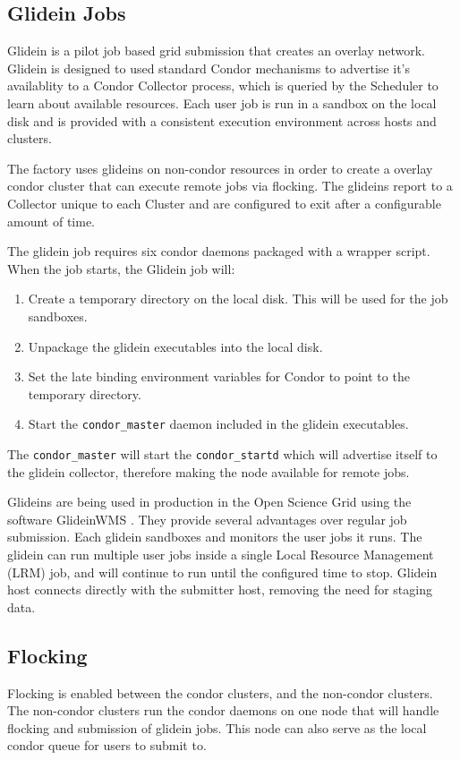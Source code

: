 \documentclass[11pt]{article}
\begin{document}
\subsection{Glidein Jobs}
Glidein  \cite{frey2002condor} is a pilot job based grid submission that creates an overlay network.  Glidein is designed to used standard Condor mechanisms to advertise it's availablity to a Condor Collector process, which is queried by the Scheduler to learn about available resources.  Each user job is run in a sandbox on the local disk and is provided with a consistent execution environment across hosts and clusters.  

The factory uses glideins on non-condor resources in order to create a overlay condor cluster that can execute remote jobs via flocking.  The glideins report to a Collector unique to each Cluster and are configured to exit after a configurable amount of time. 

The glidein job requires six condor daemons packaged with a wrapper script.  When the job starts, the Glidein job will:

\begin{enumerate}
\item Create a temporary directory on the local disk.  This will be used for the job sandboxes.
\item Unpackage the glidein executables into the local disk.
\item Set the late binding environment variables for Condor to point to the temporary directory.
\item Start the  \texttt{condor\_master} daemon included in the glidein executables.
\end{enumerate}

The \texttt{condor\_master} will start the \texttt{condor\_startd} which will advertise itself to the glidein collector, therefore making the node available for remote jobs.  

Glideins are being used in production in the Open Science Grid using the software GlideinWMS \cite{sfiligoi2008glideinwms}.  They provide several advantages over regular job submission.  Each glidein sandboxes and monitors the user jobs it runs.  The glidein can run multiple user jobs inside a single Local Resource Management (LRM) job, and will continue to run until the configured time to stop.  Glidein host connects directly with the submitter host, removing the need for staging data.

\subsection{Flocking}
Flocking is enabled between the condor clusters, and the non-condor clusters.  The non-condor clusters run the condor daemons on one node that will handle flocking and submission of glidein jobs.  This node can also serve as the local condor queue for users to submit to. 
\end{document}

